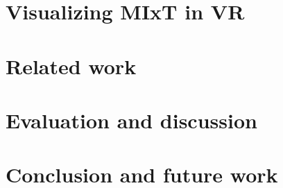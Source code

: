 \documentclass[USenglish]{uit-thesis}
\begin{document}
\chapter{Visualizing MIxT in VR}


\chapter{Related work}


\chapter{Evaluation and discussion}


\chapter{Conclusion and future work}


\printbibliography

\backmatter
\end{document}
